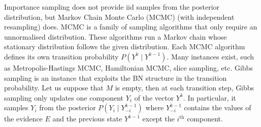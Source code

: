 Importance sampling does not provide iid samples from the posterior distribution, but Markov Chain Monte Carlo (MCMC) (with independent resampling) does. MCMC is a family of sampling algorithms that only require an unnormalised distribution. These algorithms run a Markov chain whose stationary distribution follows the given distribution. Each MCMC algorithm defines its own transition probability $P(Y^k\mid Y^{k-1})$. Many instances exist, such as Metropolis-Hastings MCMC, Hamiltonian MCMC, slice sampling, etc. Gibbs sampling is an instance that exploits the BN structure in the transition probability. Let us suppose that $M$ is empty, then at each transition step, Gibbs sampling only updates one component $Y_i$ of the vector $Y^k$. In particular, it samples $Y_i$ from the posterior $P(Y_i\mid Y_{-i}^{k-1})$ where $Y_{-i}^{k-1}$ contains the values of the evidence $E$ and the previous state $Y^{k-1}$ except the $i^{\text{th}}$ component.



